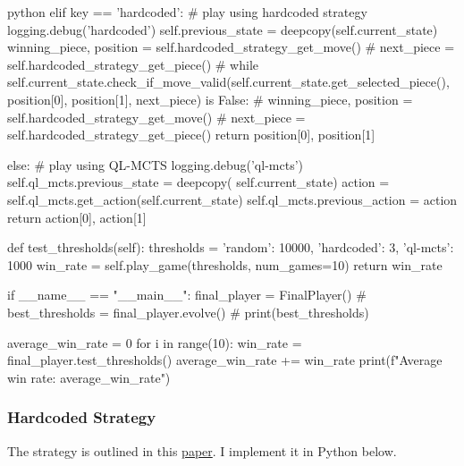 \begin{mintedbox}{python}
            elif key == 'hardcoded':
                # play using hardcoded strategy
                logging.debug('hardcoded')
                self.previous_state = deepcopy(self.current_state)
                winning_piece, position = self.hardcoded_strategy_get_move()
                # next_piece = self.hardcoded_strategy_get_piece()
                # while self.current_state.check_if_move_valid(self.current_state.get_selected_piece(), position[0], position[1], next_piece) is False:
                #     winning_piece, position = self.hardcoded_strategy_get_move()
                #     next_piece = self.hardcoded_strategy_get_piece()
                return position[0], position[1]

            else:
                # play using QL-MCTS
                logging.debug('ql-mcts')
                self.ql_mcts.previous_state = deepcopy(
                    self.current_state)
                action = self.ql_mcts.get_action(self.current_state)
                self.ql_mcts.previous_action = action
                return action[0], action[1]

    def test_thresholds(self):
        thresholds = {'random': 10000,
                        'hardcoded': 3, 'ql-mcts': 1000}
        win_rate = self.play_game(thresholds, num_games=10)
        return win_rate

if __name__ == "__main__":
    final_player = FinalPlayer()
    # best_thresholds = final_player.evolve()
    # print(best_thresholds)

    average_win_rate = 0
    for i in range(10):
        win_rate = final_player.test_thresholds()
        average_win_rate += win_rate
    print(f"Average win rate: {average_win_rate}")
\end{mintedbox}

\subsubsection{Hardcoded Strategy}

The strategy is outlined in this \href{https://scholarworks.umt.edu/cgi/viewcontent.cgi?article=1334&context=tme}{paper}. I implement it in Python below.


